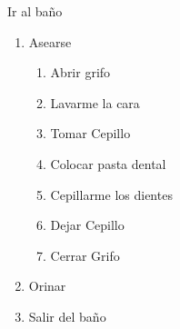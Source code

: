 \item Ir al baño
  \begin{enumerate}
  \def\labelenumi{\arabic{enumi}.}
      \tightlist
  \item Asearse 
  \begin{enumerate}
  \def\labelenumii{\arabic{enumii}.}
  \item Abrir grifo
  \item Lavarme la cara
  \item Tomar Cepillo
  \item Colocar pasta dental
\item
  Cepillarme los dientes
  \item
    Dejar Cepillo
  \item
    Cerrar Grifo
  \end{enumerate}
\item
  Orinar
  \item
    Salir del baño
  \end{enumerate}
